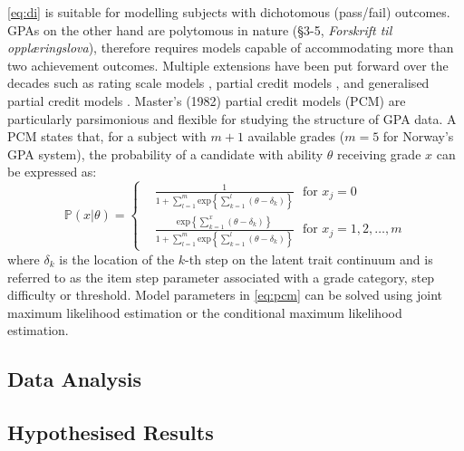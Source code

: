 \documentclass[
    a4paper,            %
    11pt,               %
    stu,                %
    donotrepeattitle,   %
    noextraspace,       %
    floatsintext,       %
    biblatex,           %
    colorlinks=true,        %
    linkcolor=red,          %
    anchorcolor=black,      %
    citecolor=blue,         %
    urlcolor=blue,          %
    bookmarks=true,         %
    bookmarksopen=false,    %
    bookmarksnumbered=true  %
]{apa7}
\newcommand{\p}[1]{\mathbb{P}\left(#1\right)}
\renewcommand{\exp}[1]{\mathrm{exp}\left\{#1\right\}}
\begin{document}
\cref{eq:di} is suitable for modelling subjects with dichotomous (pass/fail) outcomes. GPAs on the other hand are polytomous in nature (\S 3-5, \textit{Forskrift til oppl{\ae}ringslova}), therefore requires models capable of accommodating more than two achievement outcomes. Multiple extensions have been put forward over the decades such as rating scale models \parencite{rasch:1980}, partial credit models \parencite{masters:1982}, and generalised partial credit models \parencite{muraki:1992}. Master's (1982) partial credit models (PCM) are particularly parsimonious and flexible for studying the structure of GPA data. A PCM states that, for a subject with $m+1$ available grades ($m=5$ for Norway's GPA system), the probability of a candidate with ability $\theta$ receiving grade $x$ can be expressed as:
\begin{equation}\label{eq:pcm}
    \p{x|\theta}=
    \left\{
        \begin{aligned}
            &\frac{1}{1 + \sum_{l=1}^m \exp{ \sum_{k=1}^l (\theta - \delta_k) }}\ \ \ \text{for } x_j = 0\\
            &\frac{ \exp{ \sum_{k=1}^x (\theta - \delta_k) } }{1 + \sum_{l=1}^m \exp{ \sum_{k=1}^l (\theta - \delta_k) }}\ \ \ \text{for } x_j = 1,2,\dots,m
        \end{aligned}
    \right.
\end{equation}
where $\delta_k$ is the location of the $k$-th step on the latent trait continuum and is referred to as the item step parameter associated with a grade category, step difficulty or threshold. Model parameters in \cref{eq:pcm} can be solved using joint maximum likelihood estimation or the conditional maximum likelihood estimation.




\subsection{Data Analysis}


\subsection{Hypothesised Results}











\printbibliography
\end{document}
